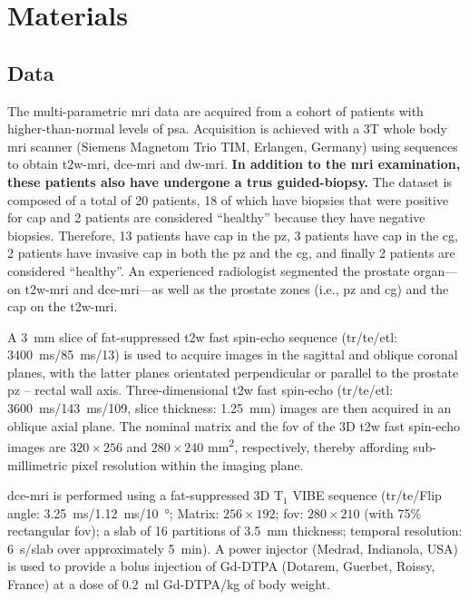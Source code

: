 \section{Materials}\label{sec:materials}

\subsection{Data}\label{sec:data}

The multi-parametric \ac{mri} data are acquired from a cohort of patients with higher-than-normal levels of \ac{psa}.
Acquisition is achieved with a 3T whole body \ac{mri} scanner (Siemens Magnetom Trio TIM, Erlangen, Germany) using sequences to obtain \ac{t2w}-\ac{mri}, \ac{dce}-\ac{mri} and \ac{dw}-\ac{mri}.
\textbf{In addition to the \ac{mri} examination, these patients also have
undergone a \ac{trus} guided-biopsy.}
The dataset is composed of a total of 20 patients, 18 of which have
biopsies that were positive for \ac{cap} and 2 patients are considered
``healthy'' because they have negative biopsies.
Therefore, 13 patients have \ac{cap} in the \ac{pz}, 3 patients have
\ac{cap} in the \ac{cg}, 2 patients have invasive \ac{cap} in both the
\ac{pz} and the \ac{cg}, and finally 2 patients are considered ``healthy''.
An experienced radiologist segmented the prostate organ---on
\ac{t2w}-\ac{mri} and \ac{dce}-\ac{mri}---as well as the prostate
zones (i.e., \ac{pz} and \ac{cg}) and the \ac{cap} on the \ac{t2w}-\ac{mri}.

A \SI{3}{\mm} slice of fat-suppressed \ac{t2w} fast spin-echo sequence
(\ac{tr}/\ac{te}/\ac{etl}: \SI{3400}{\ms}/\SI{85}{\ms}/13) is used to
acquire images in the sagittal and oblique coronal planes, with the latter planes orientated perpendicular or parallel to the prostate \ac{pz} – rectal wall axis.
Three-dimensional \ac{t2w} fast spin-echo (\ac{tr}/\ac{te}/\ac{etl}: \SI{3600}{\ms}/\SI{143}{\ms}/109, slice thickness: \SI{1.25}{\mm}) images are then acquired in an oblique axial plane.
The nominal matrix and the \ac{fov} of the 3D \ac{t2w} fast spin-echo images are $320 \times 256$ and $280 \times 240$ mm\textsuperscript{2}, respectively, thereby affording sub-millimetric pixel resolution within the imaging plane.

\ac{dce}-\ac{mri} is performed using a fat-suppressed 3D T$_1$ VIBE
sequence (\ac{tr}/\ac{te}/Flip angle:
\SI{3.25}{\ms}/\SI{1.12}{\ms}/\SI{10}{\degree}; Matrix: $256 \times
192$; \ac{fov}: $280 \times 210$ (with 75\% rectangular \ac{fov}); a slab of 16 partitions of \SI{3.5}{\mm} thickness; temporal resolution: \SI{6}{\s}/slab over approximately \SI{5}{\minute}).
A power injector (Medrad, Indianola, USA) is used to provide a bolus injection of Gd-DTPA (Dotarem, Guerbet, Roissy, France) at a dose of \SI{0.2}{\ml} Gd-DTPA/kg of body weight.

